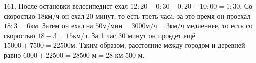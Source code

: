 161. После остановки велосипедист ехал $12:20-0:30-0:20-10:00=1:30.$ Со скоростью 18км/ч он ехал 20 минут, то есть треть часа, за это время он проехал $18:3=6$км. Затем он ехал на $50\text{м/мин}=3000\text{м/ч}=3$км/ч медленнее, то есть со скоростью $18-3=15$км/ч. За 1 час 30 минут он проедет ещё $15000+7500=22500$м. Таким образом, расстояние между городом и деревней равно $6000+22500=28500\text{ м}=28\text{ км }500\text{ м.}$\\
